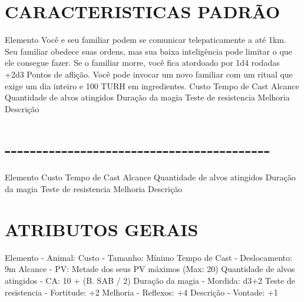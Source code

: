 \documentclass{article}%
\begin{document}
\section{CARACTERISTICAS PADRÃO}%
\label{sec:CARACTERISTICASPADRO}%
Elemento Você e seu familiar podem se comunicar telepaticamente a até 1km. Seu familiar obedece suas ordens, mas sua baixa inteligência pode limitar o que ele consegue fazer. Se o familiar morre, você fica atordoado por 1d4 rodadas +2d3 Pontos de aflição. Você pode invocar um novo familiar com um ritual que exige um dia inteiro e 100 TURH em ingredientes.\newline%
Custo \newline%
Tempo de Cast \newline%
Alcance \newline%
Quantidade de alvos atingidos \newline%
Duração da magia \newline%
Teste de resistencia \newline%
Melhoria \newline%
Descrição \newline%

%
\section{{-}{-}{-}{-}{-}{-}{-}{-}{-}{-}{-}{-}{-}{-}{-}{-}{-}{-}{-}{-}{-}{-}{-}{-}{-}{-}{-}{-}{-}{-}{-}{-}{-}{-}{-}{-}{-}{-}{-}{-}{-}{-}}%
\label{sec:{-}{-}{-}{-}{-}{-}{-}{-}{-}{-}{-}{-}{-}{-}{-}{-}{-}{-}{-}{-}{-}{-}{-}{-}{-}{-}{-}{-}{-}{-}{-}{-}{-}{-}{-}{-}{-}{-}{-}{-}{-}{-}}%
Elemento \newline%
Custo \newline%
Tempo de Cast \newline%
Alcance \newline%
Quantidade de alvos atingidos \newline%
Duração da magia \newline%
Teste de resistencia \newline%
Melhoria \newline%
Descrição \newline%

%
\section{ATRIBUTOS GERAIS}%
\label{sec:ATRIBUTOSGERAIS}%
Elemento {-} Animal:\newline%
Custo {-} Tamanho: Mínimo\newline%
Tempo de Cast {-} Deslocamento: 9m\newline%
Alcance {-} PV: Metade dos seus PV máximos (Max: 20)\newline%
Quantidade de alvos atingidos {-} CA: 10 + (B. SAB / 2)\newline%
Duração da magia {-} Mordida: d3+2\newline%
Teste de resistencia {-} Fortitude: +2\newline%
Melhoria {-} Reflexos: +4\newline%
Descrição {-} Vontade: +1\newline%
\end{document}
